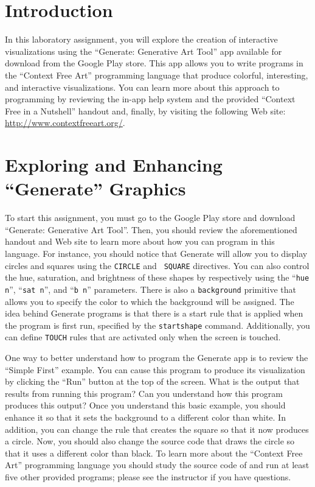 


\usepackage[compact]{titlesec}



\section*{Introduction}

In this laboratory assignment, you will explore the creation of interactive visualizations using the ``Generate:
Generative Art Tool'' app available for download from the Google Play store. This app allows you to write programs in
the ``Context Free Art'' programming language that produce colorful, interesting, and interactive visualizations. You can
learn more about this approach to programming by reviewing the in-app help system and the provided ``Context Free in a
Nutshell'' handout and, finally, by visiting the following Web site: \url{http://www.contextfreeart.org/}.

\section*{Exploring and Enhancing ``Generate'' Graphics}

To start this assignment, you must go to the Google Play store and download ``Generate: Generative Art Tool''.  Then,
you should review the aforementioned handout and Web site to learn more about how you can program in this language.  For
instance, you should notice that Generate will allow you to display circles and squares using the {\tt CIRCLE} and {\tt
SQUARE} directives.  You can also control the hue, saturation, and brightness of these shapes by respectively using the
``{\tt hue n}'', ``{\tt sat n}'', and ``{\tt b n}'' parameters. There is also a {\tt background} primitive that allows
you to specify the color to which the background will be assigned. The idea behind Generate programs is that there is a
start rule that is applied when the program is first run, specified by the {\tt startshape} command.  Additionally, you
can define {\tt TOUCH} rules that are activated only when the screen is touched.

One way to better understand how to program the Generate app is to review the ``Simple First'' example.  You can cause
this program to produce its visualization by clicking the ``Run'' button at the top of the screen. What is the output
that results from running this program? Can you understand how this program produces this output? Once you understand
this basic example, you should enhance it so that it sets the background to a different color than white. In addition,
you can change the rule that creates the square so that it now produces a circle. Now, you should also change the
source code that draws the circle so that it uses a different color than black. To learn more about the ``Context Free
Art'' programming language you should study the source code of and run at least five other provided programs; please see
the instructor if you have questions.


